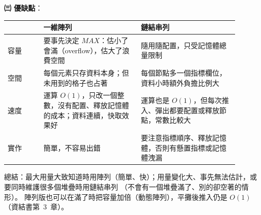 \begin{pastsoln}
\textbf{㈢ 優缺點}：
\begin{center}
\small
\begin{tabular}{p{0.14\linewidth}p{0.38\linewidth}p{0.38\linewidth}}
\toprule
 & 一維陣列 & 鏈結串列 \\
\midrule
容量 & 要事先決定 $\mathit{MAX}$：估小了會滿（overflow），估大了浪費空間 & 隨用隨配置，只受記憶體總量限制 \\
空間 & 每個元素只存資料本身；但未用到的格子也占著 & 每個節點多一個指標欄位，資料小時額外負擔比例大 \\
速度 & 運算 $O(1)$，只改一個整數，沒有配置、釋放記憶體的成本；資料連續，快取效果好 & 運算也是 $O(1)$，但每次推入、彈出都要配置或釋放節點，常數比較大 \\
實作 & 簡單，不容易出錯 & 要注意指標順序、釋放記憶體，否則有懸置指標或記憶體洩漏 \\
\bottomrule
\end{tabular}
\end{center}
總結：最大用量大致知道時用陣列（簡單、快）；用量變化大、事先無法估計，或要同時維護很多個堆疊時用鏈結串列
（不會有一個堆疊滿了、別的卻空著的情形）。 陣列版也可以在滿了時把容量加倍（動態陣列），平攤後推入仍是
$O(1)$（資結書第~3~章）。
\end{pastsoln}
